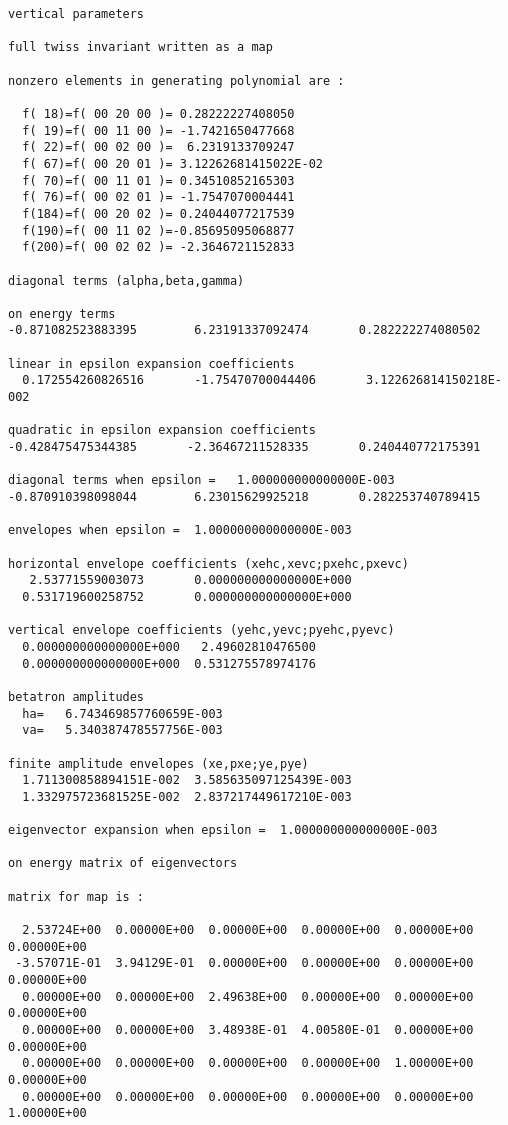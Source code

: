 \begin{footnotesize}
\begin{verbatim}
vertical parameters

full twiss invariant written as a map

nonzero elements in generating polynomial are :

  f( 18)=f( 00 20 00 )= 0.28222227408050
  f( 19)=f( 00 11 00 )= -1.7421650477668
  f( 22)=f( 00 02 00 )=  6.2319133709247
  f( 67)=f( 00 20 01 )= 3.12262681415022E-02
  f( 70)=f( 00 11 01 )= 0.34510852165303
  f( 76)=f( 00 02 01 )= -1.7547070004441
  f(184)=f( 00 20 02 )= 0.24044077217539
  f(190)=f( 00 11 02 )=-0.85695095068877
  f(200)=f( 00 02 02 )= -2.3646721152833

diagonal terms (alpha,beta,gamma)

on energy terms
-0.871082523883395        6.23191337092474       0.282222274080502

linear in epsilon expansion coefficients
  0.172554260826516       -1.75470700044406       3.122626814150218E-002

quadratic in epsilon expansion coefficients
-0.428475475344385       -2.36467211528335       0.240440772175391

diagonal terms when epsilon =   1.000000000000000E-003
-0.870910398098044        6.23015629925218       0.282253740789415

envelopes when epsilon =  1.000000000000000E-003

horizontal envelope coefficients (xehc,xevc;pxehc,pxevc)
   2.53771559003073       0.000000000000000E+000
  0.531719600258752       0.000000000000000E+000

vertical envelope coefficients (yehc,yevc;pyehc,pyevc)
  0.000000000000000E+000   2.49602810476500
  0.000000000000000E+000  0.531275578974176

betatron amplitudes
  ha=   6.743469857760659E-003
  va=   5.340387478557756E-003

finite amplitude envelopes (xe,pxe;ye,pye)
  1.711300858894151E-002  3.585635097125439E-003
  1.332975723681525E-002  2.837217449617210E-003

eigenvector expansion when epsilon =  1.000000000000000E-003

on energy matrix of eigenvectors

matrix for map is :

  2.53724E+00  0.00000E+00  0.00000E+00  0.00000E+00  0.00000E+00  0.00000E+00
 -3.57071E-01  3.94129E-01  0.00000E+00  0.00000E+00  0.00000E+00  0.00000E+00
  0.00000E+00  0.00000E+00  2.49638E+00  0.00000E+00  0.00000E+00  0.00000E+00
  0.00000E+00  0.00000E+00  3.48938E-01  4.00580E-01  0.00000E+00  0.00000E+00
  0.00000E+00  0.00000E+00  0.00000E+00  0.00000E+00  1.00000E+00  0.00000E+00
  0.00000E+00  0.00000E+00  0.00000E+00  0.00000E+00  0.00000E+00  1.00000E+00



\end{verbatim}
\end{footnotesize}
